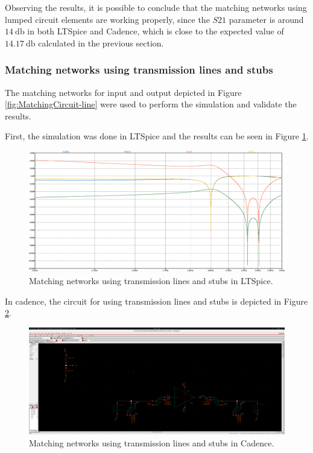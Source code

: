 Observing the results, it is possible to conclude that the matching networks using lumped circuit elements are working properly, since the $S21$ parameter is around $\SI{14}{\decibel}$ in both LTSpice and Cadence, which is close to the expected value of $\SI{14.17}{\decibel}$ calculated in the previous section.

\subsubsection{Matching networks using transmission lines and stubs}

The matching networks for input and output depicted in Figure \ref{fig:MatchingCircuit-line} were used to perform the simulation and validate the results.

First, the simulation was done in LTSpice and the results can be seen in Figure \ref{fig:LT-LSMatchingCircuit}.
\begin{figure}[H]
    \centering
    \includegraphics[width=1\textwidth]{Images/LT-LS-gain.png}
    \caption{Matching networks using transmission lines and stubs in LTSpice.}
    \label{fig:LT-LSMatchingCircuit}
\end{figure}

In cadence, the circuit for using transmission lines and stubs is depicted in Figure \ref{fig:CAD-LScircuit}.
\begin{figure}[H]
    \centering
    \includegraphics[width=1\textwidth]{Images/CadenceLScircuit.png}
    \caption{Matching networks using transmission lines and stubs in Cadence.}
    \label{fig:CAD-LScircuit}
\end{figure}


